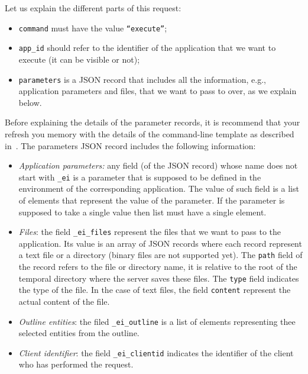 \bigskip
\noindent
Let us explain the different parts of this request: 
%
\begin{itemize}
%
\item \texttt{command} must have the value \texttt{``execute''};
%
\item \texttt{app\_id} should refer to the identifier of the
  application that we want to execute (it can be visible or not);
%
\item \texttt{parameters} is a JSON record that includes all the
  information, e.g., application parameters and files, that we want to
  pass to over, as we explain below.
\end{itemize}
%
Before explaining the details of the parameter records, it is
recommend that your refresh you memory with the details of the
command-line template as described
in~. The parameters JSON record
includes the following information:
%
\begin{itemize}
%
\item \emph{Application parameters:} any field (of the JSON record)
  whose name does not start with \texttt{\_ei} is a parameter that is
  supposed to be defined in the 
  environment of the corresponding application. The value of such
  field is a list of elements that represent the value of the
  parameter. If the parameter is supposed to take a single value then
  list must have a single element.
%
\item \emph{Files}: the field \texttt{\_ei\_files} represent the files
  that we want to pass to the application. Its value is an array of
  JSON records where each record represent a text file or a directory
  (binary files are not supported yet). The \texttt{path} field of the
  record refers to the file or directory name, it is relative to the
  root of the temporal directory where the server saves these
  files. The \texttt{type} field indicates the type of the file. In
  the case of text files, the field \texttt{content} represent the
  actual content of the file.
%
\item \emph{Outline entities}: the filed \texttt{\_ei\_outline} is a
  list of elements representing thee selected entities from the
  outline.
%
\item \emph{Client identifier}: the field \texttt{\_ei\_clientid}
  indicates the identifier of the client who has performed the
  request.
%
\end{itemize}



